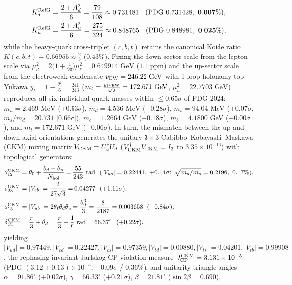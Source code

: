 \documentclass[11pt,a4paper]{article}
\begin{document}
\begin{enumerate}[label=\arabic*.]
\begin{equation}
\begin{aligned}
K_d^{\rm RefG} &= \frac{2 + A_d^2}{6} = \frac{79}{108} \approx 0.731481 \quad (\text{PDG } 0.731428,\ \mathbf{0.007\%}), \\
K_u^{\rm RefG} &= \frac{2 + A_u^2}{6} = \frac{275}{324} \approx 0.848765 \quad (\text{PDG } 0.848981,\ \mathbf{0.025\%}),
\end{aligned}
\end{equation}
while the heavy-quark cross-triplet $(c,b,t)$ retains the canonical Koide ratio $K(c,b,t) = 0.66955 \approx \frac{2}{3}$ ($0.43\%$). Fixing the down-sector scale from the lepton scale via $\mu_d^2 = 2\bigl(1 + \frac{1}{9\pi}\bigr)\mu_\ell^2 = 0.649914\text{ GeV}$ ($1.1\text{ ppm}$) and the up-sector scale from the electroweak condensate $v_{\rm EW} = 246.22\text{ GeV}$ with 1-loop holonomy top Yukawa $y_t = 1 - \frac{\theta_0^2}{6} = \frac{241}{243}$ ($m_t = \frac{y_t v_{\rm EW}}{\sqrt{2}} = 172.671\text{ GeV}$, $\mu_u^2 = 22.7703\text{ GeV}$) reproduces all six individual quark masses within $\le 0.65\sigma$ of PDG 2024: \textbf{$m_u = 2.469\text{ MeV}$} ($+0.63\sigma$), \textbf{$m_d = 4.536\text{ MeV}$} ($-0.28\sigma$), \textbf{$m_s = 94.04\text{ MeV}$} ($+0.07\sigma$, $m_s/m_d = 20.731$ [$0.66\sigma$]), \textbf{$m_c = 1.2664\text{ GeV}$} ($-0.18\sigma$), \textbf{$m_b = 4.1800\text{ GeV}$} ($+0.00\sigma$), and \textbf{$m_t = 172.671\text{ GeV}$} ($-0.06\sigma$). In turn, the mismatch between the up and down axial orientations generates the unitary $3\times 3$ Cabibbo--Kobayashi--Maskawa (CKM) mixing matrix $V_{\rm CKM} = U_u^\dagger U_d$ ($V_{\rm CKM}^\dagger V_{\rm CKM} = I_3$ to $3.35\times 10^{-16}$) with topological generators:
\begin{equation}
\begin{aligned}
\theta_{12}^{\rm CKM} &= \theta_0 + \frac{\theta_d - \theta_u}{N_{\rm hol}} = \frac{55}{243}\text{ rad}\ \ (|V_{us}| = 0.22441,\ +0.14\sigma;\ \sqrt{m_d/m_s} = 0.2196,\ 0.17\%), \\
s_{23}^{\rm CKM} &= |V_{cb}| = \frac{2}{27\sqrt{3}} = 0.04277\ \ (+1.11\sigma), \\
s_{13}^{\rm CKM} &= |V_{ub}| = 2\theta_\ell\theta_d\theta_u = \frac{\theta_0^3}{3} = \frac{8}{2187} = 0.003658\ \ (-0.84\sigma), \\
\delta_{\rm CP}^{\rm CKM} &= \frac{\pi}{3} + \theta_d = \frac{\pi}{3} + \frac{1}{9}\text{ rad} = 66.37^\circ\ \ (+0.22\sigma),
\end{aligned}
\end{equation}
yielding $|V_{ud}| = 0.97449, |V_{cd}| = 0.22427, |V_{cs}| = 0.97359, |V_{td}| = 0.00880, |V_{ts}| = 0.04201, |V_{tb}| = 0.99908$, the rephasing-invariant Jarlskog CP-violation measure \textbf{$J_{\rm CP}^{\rm CKM} = 3.131\times 10^{-5}$} (PDG $(3.12 \pm 0.13)\times 10^{-5}$, \textbf{$+0.09\sigma$} / $0.36\%$), and unitarity triangle angles $\alpha = 91.86^\circ$ ($+0.02\sigma$), $\gamma = 66.33^\circ$ ($+0.21\sigma$), $\beta = 21.81^\circ$ ($\sin 2\beta = 0.690$).
\end{enumerate}
\end{document}
